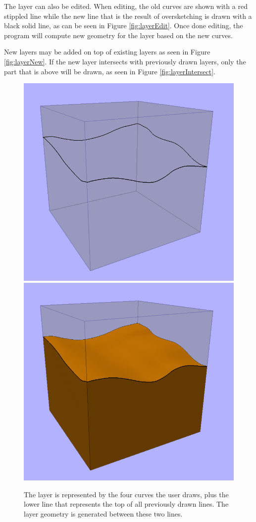 \documentclass[a4paper,12pt]{report}
\begin{document}
The layer can also be edited. When editing, the old curves are shown with a red stippled line while the new line that is the result of oversketching is drawn with a black solid line, as can be seen in Figure \ref{fig:layerEdit}. Once done editing, the program will compute new geometry for the layer based on the new curves.

New layers may be added on top of existing layers as seen in Figure \ref{fig:layerNew}. If the new layer intersects with previously drawn layers, only the part that is above will be drawn, as seen in Figure \ref{fig:layerIntersect}.

\begin{figure}
\includegraphics[width=.5\linewidth]{thesis/results/simpleLayerDraw.png}
\includegraphics[width=.5\linewidth]{thesis/results/simpleLayerCreate.png}
 \caption{The layer is represented by the four curves the user draws, plus the lower line that represents the top of all previously drawn lines. The layer geometry is generated between these two lines.}
 \label{fig:layerCreate}
\end{figure}
\end{document}
